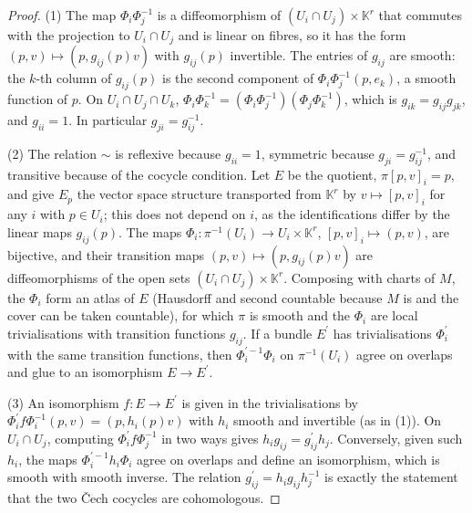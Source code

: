 \begin{proof}
(1) The map $\Phi_i\Phi_j^{-1}$ is a diffeomorphism of $(U_i \cap U_j) \times \mathbb{K}^r$ that commutes with the projection to $U_i \cap U_j$ and is linear on fibres, so it has
the form $(p, v) \mapsto (p, g_{ij}(p)v)$ with $g_{ij}(p)$ invertible. The entries of $g_{ij}$ are smooth: the $k$-th column of $g_{ij}(p)$ is the second component of
$\Phi_i\Phi_j^{-1}(p, e_k)$, a smooth function of $p$. On $U_i \cap U_j \cap U_k$, $\Phi_i\Phi_k^{-1} = (\Phi_i\Phi_j^{-1})(\Phi_j\Phi_k^{-1})$, which is $g_{ik} = g_{ij}g_{jk}$, and $g_{ii} = 1$.
In particular $g_{ji} = g_{ij}^{-1}$.

(2) The relation $\sim$ is reflexive because $g_{ii} = 1$, symmetric because $g_{ji} = g_{ij}^{-1}$, and transitive because of the cocycle condition. Let $E$ be the quotient,
$\pi[p, v]_i = p$, and give $E_p$ the vector space structure transported from $\mathbb{K}^r$ by $v \mapsto [p, v]_i$ for any $i$ with $p \in U_i$; this does not depend on $i$, as the
identifications differ by the linear maps $g_{ij}(p)$. The maps $\Phi_i \colon \pi^{-1}(U_i) \to U_i \times \mathbb{K}^r$, $[p, v]_i \mapsto (p, v)$, are bijective, and their transition maps
$(p, v) \mapsto (p, g_{ij}(p)v)$ are diffeomorphisms of the open sets $(U_i \cap U_j) \times \mathbb{K}^r$. Composing with charts of $M$, the $\Phi_i$ form an atlas of $E$ (Hausdorff and second
countable because $M$ is and the cover can be taken countable), for which $\pi$ is smooth and the $\Phi_i$ are local trivialisations with transition functions $g_{ij}$. If a bundle
$E^{\prime}$ has trivialisations $\Phi^{\prime}_i$ with the same transition functions, then $\Phi_i^{\prime-1}\Phi_i$ on $\pi^{-1}(U_i)$ agree on overlaps and glue to an isomorphism $E \to E^{\prime}$.

(3) An isomorphism $f \colon E \to E^{\prime}$ is given in the trivialisations by $\Phi^{\prime}_if\Phi_i^{-1}(p, v) = (p, h_i(p)v)$ with $h_i$ smooth and invertible (as in (1)). On
$U_i \cap U_j$, computing $\Phi^{\prime}_if\Phi_j^{-1}$ in two ways gives $h_ig_{ij} = g^{\prime}_{ij}h_j$. Conversely, given such $h_i$, the maps $\Phi_i^{\prime-1}h_i\Phi_i$ agree on overlaps and define
an isomorphism, which is smooth with smooth inverse. The relation $g^{\prime}_{ij} = h_ig_{ij}h_j^{-1}$ is exactly the statement that the two \v{C}ech cocycles are cohomologous.
\end{proof}

